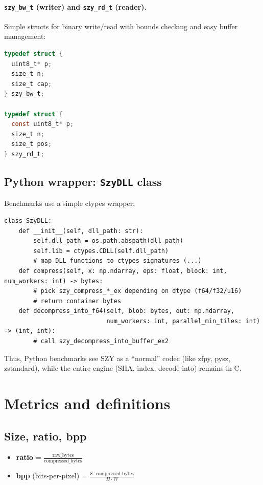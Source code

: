 \documentclass[11pt,a4paper]{article}
\begin{document}
\paragraph{\texttt{szy\_bw\_t} (writer) and \texttt{szy\_rd\_t} (reader).}
Simple structs for binary write/read with bounds checking and easy buffer management:
\begin{lstlisting}[style=cstyle,language=C]
typedef struct {
  uint8_t* p;
  size_t n;
  size_t cap;
} szy_bw_t;

typedef struct {
  const uint8_t* p;
  size_t n;
  size_t pos;
} szy_rd_t;
\end{lstlisting}

\subsection{Python wrapper: \texttt{SzyDLL} class}
Benchmarks use a simple ctypes wrapper:
\begin{lstlisting}[style=txtstyle,caption={SzyDLL class (Python, bench_common.py)}]
class SzyDLL:
    def __init__(self, dll_path: str):
        self.dll_path = os.path.abspath(dll_path)
        self.lib = ctypes.CDLL(self.dll_path)
        # map DLL functions to ctypes signatures (...)
    def compress(self, x: np.ndarray, eps: float, block: int, num_workers: int) -> bytes:
        # pick szy_compress_*_ex depending on dtype (f64/f32/u16)
        # return container bytes
    def decompress_into_f64(self, blob: bytes, out: np.ndarray,
                            num_workers: int, parallel_min_tiles: int) -> (int, int):
        # call szy_decompress_into_buffer_ex2
\end{lstlisting}
Thus, Python benchmarks see SZY as a ``normal'' codec (like zfpy, pysz, zstandard), while the entire engine (SHA, index, decode-into) remains in C.

\section{Metrics and definitions}

\subsection{Size, ratio, bpp}
\begin{itemize}
  \item \textbf{ratio} = $\frac{\text{raw\_bytes}}{\text{compressed\_bytes}}$
  \item \textbf{bpp} (bits-per-pixel) = $\frac{8\cdot \text{compressed\_bytes}}{H\cdot W}$
\end{itemize}
\end{document}
